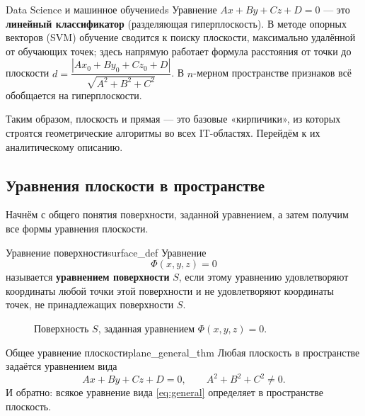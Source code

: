 \documentclass[12pt,a4paper]{article}
\begin{document}
\begin{remarkIT}{Data Science и машинное обучение}{ds}
  Уравнение $Ax + By + Cz + D = 0$ --- это \textbf{линейный
  классификатор} (разделяющая гиперплоскость). В методе опорных
  векторов (SVM) обучение сводится к поиску плоскости, максимально
  удалённой от обучающих точек; здесь напрямую работает формула
  расстояния от точки до плоскости
  $d = \dfrac{|Ax_0 + By_0 + Cz_0 + D|}{\sqrt{A^2+B^2+C^2}}$.
  В $n$-мерном пространстве признаков всё обобщается на гиперплоскости.
\end{remarkIT}

Таким образом, плоскость и прямая --- это базовые «кирпичики», из
которых строятся геометрические алгоритмы во всех IT-областях. Перейдём
к их аналитическому описанию.

\subsection*{Уравнения плоскости в пространстве}

Начнём с общего понятия поверхности, заданной уравнением, а затем
получим все формы уравнения плоскости.

\begin{definition}{Уравнение поверхности}{surface_def}
  Уравнение
  \[
    \Phi(x, y, z) = 0
  \]
  называется \textbf{уравнением поверхности} $S$, если этому уравнению
  удовлетворяют координаты любой точки этой поверхности и не
  удовлетворяют координаты точек, не принадлежащих поверхности $S$.
\end{definition}

\begin{figure}[h!]
  \centering
  \caption{Поверхность $S$, заданная уравнением $\Phi(x,y,z)=0$.}
  \label{fig:surface}
\end{figure}

\begin{theorem}{Общее уравнение плоскости}{plane_general_thm}
  Любая плоскость в пространстве задаётся уравнением вида
  \begin{equation}
    Ax + By + Cz + D = 0, \qquad A^2+B^2+C^2 \neq 0.
    \tag{10.1}\label{eq:general}
  \end{equation}
  И обратно: всякое уравнение вида \eqref{eq:general} определяет в
  пространстве плоскость.
\end{theorem}
\end{document}
